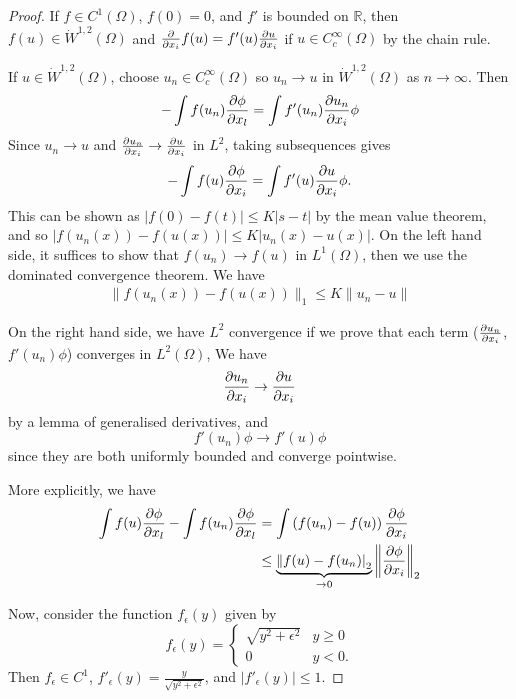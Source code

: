 \documentclass[10pt, oneside, reqno]{amsart}
\theoremstyle{plain}%
\numberwithin{equation}{section}
\theoremstyle{definition}
\theoremstyle{remark}
\newcommand{\R}{\mathbb{R}}
\begin{document}
\begin{proof}
    If $f \in C^1(\Omega)$, $f(0) = 0$, and $f'$ is bounded on $\R$, then $f(u) \in \dot W^{1,2}(\Omega)$ and $\frac{\partial }{\partial x_i} f(u) = f'(u) \frac{\partial u}{\partial x_i}$ if $u \in C^\infty_c(\Omega)$ by the chain rule.  
    
    If $u \in \dot W^{1, 2}(\Omega)$, choose $u_n \in C^\infty_c(\Omega)$ so $u_n \rightarrow u$ in $\dot W^{1, 2}(\Omega)$ as $n \rightarrow \infty$.  Then \begin{align*}
        -\int f(u_n) \frac{\partial \phi}{\partial x_l} = \int f'(u_n) \frac{\partial u_n}{\partial x_i} \phi
    \end{align*}
    Since $u_n \rightarrow u$ and $\frac{\partial u_n}{\partial x_i} \rightarrow \frac{\partial u}{\partial x_i}$ in $L^2$, taking subsequences gives \[
        - \int f(u) \frac{\partial \phi}{\partial x_i} = \int f'(u) \frac{\partial u}{\partial x_i} \phi \qedhere.
    \]  This can be shown as $|f(0) - f(t)| \leq K |s-t|$ by the mean value theorem, and so $|f(u_n(x)) - f(u(x))| \leq K | u_n(x) - u(x) |$.  On the left hand side, it suffices to show that $f(u_n) \rightarrow f(u)$ in $L^1(\Omega)$, then we use the dominated convergence theorem.  We have \begin{align*}
    	\|f(u_n(x)) - f(u(x)) \|_1 \leq K \| u_n - u \|
    \end{align*}

On the right hand side, we have $L^2$ convergence if we prove that each term ($\frac{\partial u_n}{\partial x_i}$, $f'(u_n) \phi$) converges in $L^2(\Omega)$,  We have \[
	\frac{\partial u_n}{\partial x_i} \rightarrow \frac{\partial u}{\partial x_i}
\] by a lemma of generalised derivatives, and \[
	f'(u_n) \phi \rightarrow f'(u) \phi
\] since they are both uniformly bounded and converge pointwise.
    
    More explicitly, we have \begin{align*}
        \int f(u) \frac{\partial \phi}{\partial x_l} - \int f(u_n) \frac{\partial \phi}{\partial x_l} &= \int \left(f(u_n) - f(u) \right) \frac{\partial \phi}{\partial x_i} \\
        &\leq \underbrace{\left\| f(u) - f(u_n) \right|_2}_{\rightarrow 0} \left\| \frac{\partial \phi}{\partial x_i} \right\|_2
    \end{align*}

	Now, consider the function $f_\epsilon(y)$ given by \[
		f_\epsilon(y) = \begin{cases}
			\sqrt{y^2 + \epsilon^2} & y \geq 0 \\
			0 & y < 0.
		\end{cases}
	\]  Then $f_\epsilon \in C^1$, $f'_\epsilon (y) = \frac{y}{\sqrt{y^2 + \epsilon^2}}$, and $|f'_\epsilon (y)| \leq 1$.  
	

\end{proof}
\end{document}
